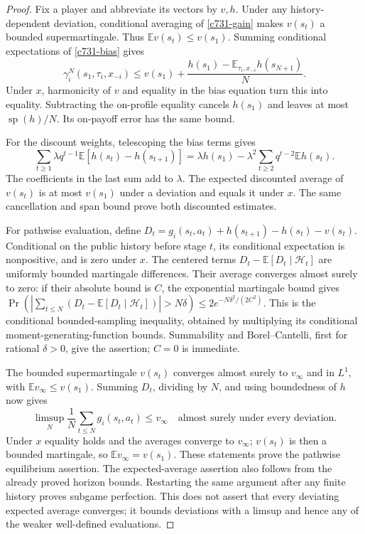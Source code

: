 \documentclass[11pt,a4paper]{article}
\newcommand{\E}{\mathbb E}
\theoremstyle{definition}
\theoremstyle{remark}
\begin{document}
\begin{proof}
Fix a player and abbreviate its vectors by $v,h$. Under any history-dependent deviation, conditional averaging of \eqref{c731-gain} makes $v(s_t)$ a bounded supermartingale. Thus $\E v(s_t)\leq v(s_1)$. Summing conditional expectations of \eqref{c731-bias} gives
\[
 \gamma_i^N(s_1,\tau_i,x_{-i})
 \leq v(s_1)+\frac{h(s_1)-\E_{\tau_i,x_{-i}}h(s_{N+1})}{N}.
\]
Under $x$, harmonicity of $v$ and equality in the bias equation turn this into equality. Subtracting the on-profile equality cancels $h(s_1)$ and leaves at most $\operatorname{sp}(h)/N$. Its on-payoff error has the same bound.

For the discount weights, telescoping the bias terms gives
\[
 \sum_{t\geq1}\lambda q^{t-1}\E[h(s_t)-h(s_{t+1})]
 =\lambda h(s_1)-\lambda^2\sum_{t\geq2}q^{t-2}\E h(s_t).
\]
The coefficients in the last sum add to $\lambda$. The expected discounted average of $v(s_t)$ is at most $v(s_1)$ under a deviation and equals it under $x$. The same cancellation and span bound prove both discounted estimates.

For pathwise evaluation, define
$D_t=g_i(s_t,a_t)+h(s_{t+1})-h(s_t)-v(s_t)$.
Conditional on the public history before stage $t$, its conditional expectation is nonpositive, and is zero under $x$. The centered terms $D_t-\E[D_t\mid\mathcal H_t]$ are uniformly bounded martingale differences. Their average converges almost surely to zero: if their absolute bound is $C$, the exponential martingale bound gives
$\Pr(|\sum_{t\leq N}(D_t-\E[D_t\mid\mathcal H_t])|>N\delta)
\leq2e^{-N\delta^2/(2C^2)}$.
This is the conditional bounded-sampling inequality, obtained by multiplying its conditional moment-generating-function bounds. Summability and Borel--Cantelli, first for rational $\delta>0$, give the assertion; $C=0$ is immediate.

The bounded supermartingale $v(s_t)$ converges almost surely to $v_\infty$ and in $L^1$, with $\E v_\infty\leq v(s_1)$. Summing $D_t$, dividing by $N$, and using boundedness of $h$ now gives
\[
 \limsup_N\frac1N\sum_{t\leq N}g_i(s_t,a_t)\leq v_\infty
 \quad\text{almost surely under every deviation}.
\]
Under $x$ equality holds and the averages converge to $v_\infty$; $v(s_t)$ is then a bounded martingale, so $\E v_\infty=v(s_1)$. These statements prove the pathwise equilibrium assertion. The expected-average assertion also follows from the already proved horizon bounds. Restarting the same argument after any finite history proves subgame perfection. This does not assert that every deviating expected average converges; it bounds deviations with a limsup and hence any of the weaker well-defined evaluations.
\end{proof}
\end{document}
